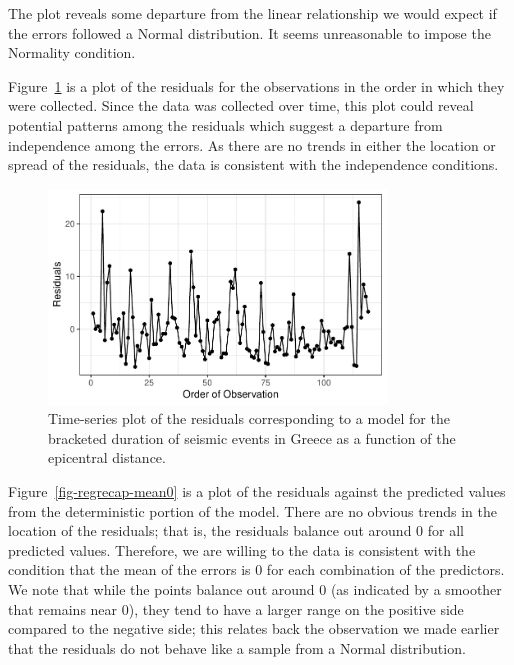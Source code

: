 \documentclass[
  letterpaper,
  DIV=11,
  numbers=noendperiod]{scrreprt}
\theoremstyle{definition}
\theoremstyle{definition}
\theoremstyle{plain}
\theoremstyle{remark}
\begin{document}
The plot reveals some departure from the linear relationship we would
expect if the errors followed a Normal distribution. It seems
unreasonable to impose the Normality condition.

Figure~\ref{fig-regrecap-indep} is a plot of the residuals for the
observations in the order in which they were collected. Since the data
was collected over time, this plot could reveal potential patterns among
the residuals which suggest a departure from independence among the
errors. As there are no trends in either the location or spread of the
residuals, the data is consistent with the independence conditions.

\begin{figure}

{\centering \includegraphics[width=0.8\textwidth,height=\textheight]{./images/fig-regrecap-indep-1.pdf}

}

\caption{\label{fig-regrecap-indep}Time-series plot of the residuals
corresponding to a model for the bracketed duration of seismic events in
Greece as a function of the epicentral distance.}

\end{figure}

Figure~\ref{fig-regrecap-mean0} is a plot of the residuals against the
predicted values from the deterministic portion of the model. There are
no obvious trends in the location of the residuals; that is, the
residuals balance out around 0 for all predicted values. Therefore, we
are willing to the data is consistent with the condition that the mean
of the errors is 0 for each combination of the predictors. We note that
while the points balance out around 0 (as indicated by a smoother that
remains near 0), they tend to have a larger range on the positive side
compared to the negative side; this relates back the observation we made
earlier that the residuals do not behave like a sample from a Normal
distribution.
\end{document}
